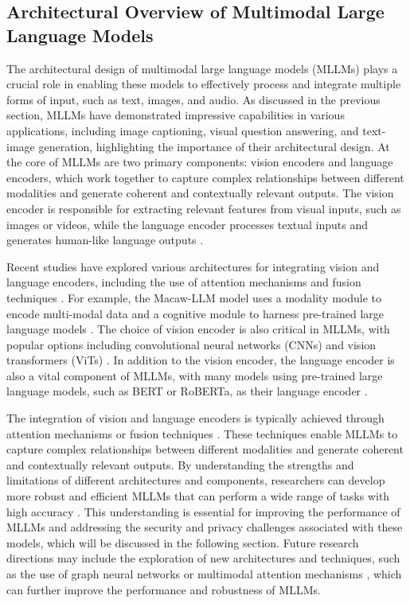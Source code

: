 \documentclass[11pt,a4paper]{article}
\begin{document}
\subsection{Architectural Overview of Multimodal Large Language Models}


The architectural design of multimodal large language models (MLLMs) plays a crucial role in enabling these models to effectively process and integrate multiple forms of input, such as text, images, and audio. As discussed in the previous section, MLLMs have demonstrated impressive capabilities in various applications, including image captioning, visual question answering, and text-image generation, highlighting the importance of their architectural design. At the core of MLLMs are two primary components: vision encoders and language encoders, which work together to capture complex relationships between different modalities and generate coherent and contextually relevant outputs. The vision encoder is responsible for extracting relevant features from visual inputs, such as images or videos, while the language encoder processes textual inputs and generates human-like language outputs \cite{arxiv:1903.02930}.

Recent studies have explored various architectures for integrating vision and language encoders, including the use of attention mechanisms and fusion techniques \cite{arxiv:2306.09093}. For example, the Macaw-LLM model uses a modality module to encode multi-modal data and a cognitive module to harness pre-trained large language models \cite{arxiv:2306.09093}. The choice of vision encoder is also critical in MLLMs, with popular options including convolutional neural networks (CNNs) and vision transformers (ViTs) \cite{doi:10.1007/s11633-022-1410-8}. In addition to the vision encoder, the language encoder is also a vital component of MLLMs, with many models using pre-trained large language models, such as BERT or RoBERTa, as their language encoder \cite{doi:10.18653/v1/2023.acl-long.411}.

The integration of vision and language encoders is typically achieved through attention mechanisms or fusion techniques \cite{arxiv:2402.12750}. These techniques enable MLLMs to capture complex relationships between different modalities and generate coherent and contextually relevant outputs. By understanding the strengths and limitations of different architectures and components, researchers can develop more robust and efficient MLLMs that can perform a wide range of tasks with high accuracy \cite{arxiv:2408.08632}. This understanding is essential for improving the performance of MLLMs and addressing the security and privacy challenges associated with these models, which will be discussed in the following section. Future research directions may include the exploration of new architectures and techniques, such as the use of graph neural networks or multimodal attention mechanisms \cite{doi:10.1109/bigdata59044.2023.10386743}, which can further improve the performance and robustness of MLLMs.
\end{document}
